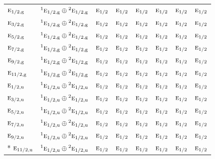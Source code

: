 \documentclass[10pt,a4paper]{article}
\numberwithin{equation}{section}
\newcommand{\irr}[1]{\text{\normalfont\scshape #1}}
\newcommand{\conjpair}[1]{{}^{#1}}
\newcommand{\ptag}[1]{\mathrm{#1}}
\begin{document}
{\begin{longtable}{@{}lccccccc@{}}
$\irr{e}_{1/2,\ptag{g}}$ & $\conjpair{1}\irr{e}_{1/2,\ptag{g}}\oplus \conjpair{2}\irr{e}_{1/2,\ptag{g}}$ & $\irr{e}_{1/2}$ & $\irr{e}_{1/2}$ & $\irr{e}_{1/2}$ & $\irr{e}_{1/2}$ & $\irr{e}_{1/2}$ & $\irr{e}_{1/2}$\\
$\irr{e}_{3/2,\ptag{g}}$ & $\conjpair{1}\irr{e}_{1/2,\ptag{g}}\oplus \conjpair{2}\irr{e}_{1/2,\ptag{g}}$ & $\irr{e}_{1/2}$ & $\irr{e}_{1/2}$ & $\irr{e}_{1/2}$ & $\irr{e}_{1/2}$ & $\irr{e}_{1/2}$ & $\irr{e}_{1/2}$\\
$\irr{e}_{5/2,\ptag{g}}$ & $\conjpair{1}\irr{e}_{1/2,\ptag{g}}\oplus \conjpair{2}\irr{e}_{1/2,\ptag{g}}$ & $\irr{e}_{1/2}$ & $\irr{e}_{1/2}$ & $\irr{e}_{1/2}$ & $\irr{e}_{1/2}$ & $\irr{e}_{1/2}$ & $\irr{e}_{1/2}$\\
$\irr{e}_{7/2,\ptag{g}}$ & $\conjpair{1}\irr{e}_{1/2,\ptag{g}}\oplus \conjpair{2}\irr{e}_{1/2,\ptag{g}}$ & $\irr{e}_{1/2}$ & $\irr{e}_{1/2}$ & $\irr{e}_{1/2}$ & $\irr{e}_{1/2}$ & $\irr{e}_{1/2}$ & $\irr{e}_{1/2}$\\
$\irr{e}_{9/2,\ptag{g}}$ & $\conjpair{1}\irr{e}_{1/2,\ptag{g}}\oplus \conjpair{2}\irr{e}_{1/2,\ptag{g}}$ & $\irr{e}_{1/2}$ & $\irr{e}_{1/2}$ & $\irr{e}_{1/2}$ & $\irr{e}_{1/2}$ & $\irr{e}_{1/2}$ & $\irr{e}_{1/2}$\\
$\irr{e}_{11/2,\ptag{g}}$ & $\conjpair{1}\irr{e}_{1/2,\ptag{g}}\oplus \conjpair{2}\irr{e}_{1/2,\ptag{g}}$ & $\irr{e}_{1/2}$ & $\irr{e}_{1/2}$ & $\irr{e}_{1/2}$ & $\irr{e}_{1/2}$ & $\irr{e}_{1/2}$ & $\irr{e}_{1/2}$\\
$\irr{e}_{1/2,\ptag{u}}$ & $\conjpair{1}\irr{e}_{1/2,\ptag{u}}\oplus \conjpair{2}\irr{e}_{1/2,\ptag{u}}$ & $\irr{e}_{1/2}$ & $\irr{e}_{1/2}$ & $\irr{e}_{1/2}$ & $\irr{e}_{1/2}$ & $\irr{e}_{1/2}$ & $\irr{e}_{1/2}$\\
$\irr{e}_{3/2,\ptag{u}}$ & $\conjpair{1}\irr{e}_{1/2,\ptag{u}}\oplus \conjpair{2}\irr{e}_{1/2,\ptag{u}}$ & $\irr{e}_{1/2}$ & $\irr{e}_{1/2}$ & $\irr{e}_{1/2}$ & $\irr{e}_{1/2}$ & $\irr{e}_{1/2}$ & $\irr{e}_{1/2}$\\
$\irr{e}_{5/2,\ptag{u}}$ & $\conjpair{1}\irr{e}_{1/2,\ptag{u}}\oplus \conjpair{2}\irr{e}_{1/2,\ptag{u}}$ & $\irr{e}_{1/2}$ & $\irr{e}_{1/2}$ & $\irr{e}_{1/2}$ & $\irr{e}_{1/2}$ & $\irr{e}_{1/2}$ & $\irr{e}_{1/2}$\\
$\irr{e}_{7/2,\ptag{u}}$ & $\conjpair{1}\irr{e}_{1/2,\ptag{u}}\oplus \conjpair{2}\irr{e}_{1/2,\ptag{u}}$ & $\irr{e}_{1/2}$ & $\irr{e}_{1/2}$ & $\irr{e}_{1/2}$ & $\irr{e}_{1/2}$ & $\irr{e}_{1/2}$ & $\irr{e}_{1/2}$\\
$\irr{e}_{9/2,\ptag{u}}$ & $\conjpair{1}\irr{e}_{1/2,\ptag{u}}\oplus \conjpair{2}\irr{e}_{1/2,\ptag{u}}$ & $\irr{e}_{1/2}$ & $\irr{e}_{1/2}$ & $\irr{e}_{1/2}$ & $\irr{e}_{1/2}$ & $\irr{e}_{1/2}$ & $\irr{e}_{1/2}$\\*
$\irr{e}_{11/2,\ptag{u}}$ & $\conjpair{1}\irr{e}_{1/2,\ptag{u}}\oplus \conjpair{2}\irr{e}_{1/2,\ptag{u}}$ & $\irr{e}_{1/2}$ & $\irr{e}_{1/2}$ & $\irr{e}_{1/2}$ & $\irr{e}_{1/2}$ & $\irr{e}_{1/2}$ & $\irr{e}_{1/2}$\\
\bottomrule\end{longtable}}
\end{document}
